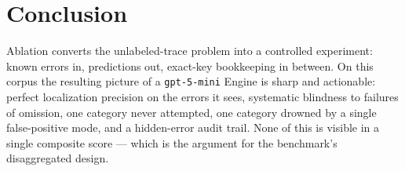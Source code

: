 \documentclass[11pt]{article}
\newcommand{\code}[1]{\texttt{#1}}
\begin{document}
\section{Conclusion}

Ablation converts the unlabeled-trace problem into a controlled experiment: known errors in, predictions out, exact-key bookkeeping in between. On this corpus the resulting picture of a \code{gpt-5-mini} Engine is sharp and actionable: perfect localization precision on the errors it sees, systematic blindness to failures of omission, one category never attempted, one category drowned by a single false-positive mode, and a hidden-error audit trail. None of this is visible in a single composite score --- which is the argument for the benchmark's disaggregated design.
\end{document}
